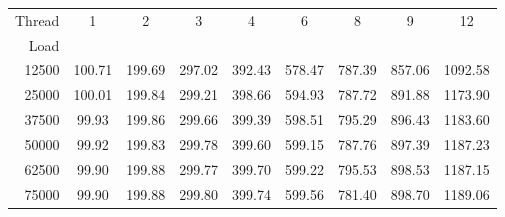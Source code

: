 \begin{tabular}{rcccccccc}
\toprule
Thread & 1 & 2 & 3 & 4 & 6 & 8 & 9 & 12 \\
Load &  &  &  &  &  &  &  &  \\
\midrule
12500 & 100.71 & 199.69 & 297.02 & 392.43 & 578.47 & 787.39 & 857.06 & 1092.58 \\
25000 & 100.01 & 199.84 & 299.21 & 398.66 & 594.93 & 787.72 & 891.88 & 1173.90 \\
37500 & 99.93 & 199.86 & 299.66 & 399.39 & 598.51 & 795.29 & 896.43 & 1183.60 \\
50000 & 99.92 & 199.83 & 299.78 & 399.60 & 599.15 & 787.76 & 897.39 & 1187.23 \\
62500 & 99.90 & 199.88 & 299.77 & 399.70 & 599.22 & 795.53 & 898.53 & 1187.15 \\
75000 & 99.90 & 199.88 & 299.80 & 399.74 & 599.56 & 781.40 & 898.70 & 1189.06 \\
\bottomrule
\end{tabular}
